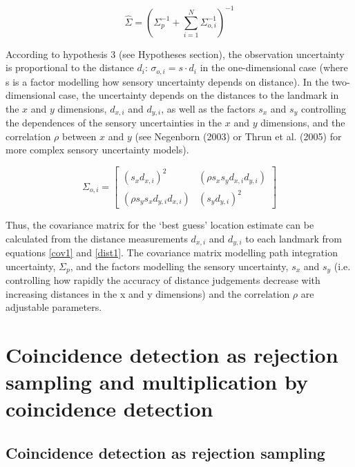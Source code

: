 \begin{equation}\label{cov1}
\hat { \Sigma  } =(\Sigma_p ^{ -1 }+\sum _{ i=1 }^{ N }{ \Sigma _{ o,i }^{ -1 } } )^{ -1 }
\end{equation}

According to hypothesis 3 (see Hypotheses section), the observation uncertainty is proportional to the distance $ d_i $: $ \sigma_{o,i} = s \cdot d_i $ in the one-dimensional case (where s is a factor modelling how sensory uncertainty depends on distance). In the two-dimensional case, the uncertainty depends on the distances to the landmark in the $ x $ and $ y $ dimensions, $ d_{x, i} $ and $ d_{y, i} $, as well as the factors $ s_x $ and $ s_y $ controlling the dependences of the sensory uncertainties in the $ x $ and $ y $ dimensions, and the correlation $ \rho $ between $x$ and $y$ (see Negenborn (2003) or Thrun et al. (2005) for more complex sensory uncertainty models).

\begin{equation}\label{dist1}
\Sigma_{o, i} = \begin{bmatrix} (s_x  d_{x, i})^2  & (\rho s_x  s_y  d_{x, i}  d_{y, i})  \\ (\rho s_y s_x  d_{y, i}  d_{x, i})  & (s_y  d_{y, i})^2  \end{bmatrix}
\end{equation}

Thus, the covariance matrix for the `best guess' location estimate can be calculated from the distance measurements $ d_{x, i} $ and $ d_{y, i} $ to each landmark from equations \eqref{cov1} and \eqref{dist1}. The covariance matrix modelling path integration uncertainty, $ \Sigma_p $, and the factors modelling the sensory uncertainty, $s_x$ and $s_y$ (i.e. controlling how rapidly the accuracy of distance judgements decrease with increasing distances in the x and y dimensions) and the correlation $\rho$ are adjustable parameters.



\section[Place cell rejection sampling and multiplication]{Coincidence detection as rejection sampling and multiplication by coincidence detection}

\subsection*{Coincidence detection as rejection sampling}


